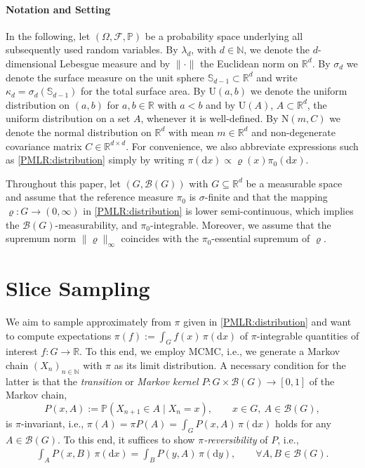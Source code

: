 \documentclass[sn-mathphys-num]{sn-jnl}%
\theoremstyle{thmstyleone}%
\theoremstyle{thmstyletwo}%
\theoremstyle{thmstylethree}%
\newcommand{\change}[1]{\bgroup\color{black}#1\egroup}    %
\begin{document}
\paragraph{Notation \change{and Setting}}
In the following, let $(\Omega, \mathcal{F}, \mathbb{P})$ be a probability space \change{underlying} all subsequently used random variables. By $\lambda_d$, with $d\in\mathbb N$, we denote the $d$-dimensional Lebesgue measure and by $\lVert \cdot \rVert$ the Euclidean norm on $\mathbb R^d$. 
By $\sigma_d$ we denote the surface measure on the unit sphere $\mathbb{S}_{d-1}\subset \mathbb R^d$ and write $\kappa_d=\sigma_d(\mathbb{S}_{d-1})$ for the total surface area. By $\mathrm{U}(a,b)$ we denote the uniform distribution on $(a,b)$ for $a, b\in\mathbb{R}$ with $a<b$ and by $\mathrm{U}(A)$\change{, $A\subset \mathbb R^d$,} the uniform distribution on a set $A$, whenever it is well-defined.
By $\mathrm N(m,C)$ we denote the normal distribution on $\mathbb{R}^d$ with mean $m \in \mathbb{R}^d$ and non-degenerate covariance matrix $C \in \mathbb{R}^{d\times d}$.
For convenience, we also 
abbreviate expressions 
such as \eqref{PMLR:distribution} simply by writing $\pi(\mathrm{d}x)\propto\varrho(x) \pi_0(\mathrm{d}x)$. 

\change{
Throughout this paper, let $(G,\mathcal{B}(G))$ with $G\subseteq \mathbb R^d$ be a measurable space and assume that the reference measure $\pi_0$ is $\sigma$-finite and that the mapping $\varrho\colon G\to(0,\infty)$ in \eqref{PMLR:distribution} is lower semi-continuous, which implies the $\mathcal{B}(G)$-measurability, and $\pi_0$-integrable.
Moreover, we assume that the supremum norm $\|\varrho\|_\infty$ coincides with the $\pi_0$-essential supremum of $\varrho$.    
}

\section{Slice Sampling}\label{sec:slice}
We aim to sample approximately from $\pi$ given in \eqref{PMLR:distribution} and want to compute expectations $\pi(f) := \int_G f(x)\, \pi(\mathrm{d} x)$ of $\pi$-integrable quantities of interest $f\colon G\to\mathbb R$. 
To this end, we employ MCMC, i.e., we generate a Markov chain $(X_n)_{n\in\mathbb{N}}$ with $\pi$ as its limit distribution.  
A necessary condition for the latter is that the \emph{transition} or \emph{Markov kernel} $P\colon G \times \mathcal{B}(G) \to [0,1]$ of the Markov chain,
\[
	P(x,A) 
    :=
    \mathbb{P}(X_{n+1}\in A \mid X_n=x),
    \qquad
    x \in G, \ A \in \mathcal{B}(G),
\]
is $\pi$-invariant, i.e., $\pi(A) = \pi P(A) = \int_G P(x, A)\, \pi(\mathrm d x)$ holds for any $A \in \mathcal{B}(G)$. To this end, it suffices to show \emph{$\pi$-reversibility} of $P$, i.e.,
\begin{align*}%
    \int_{A} P(x,B)  \, \pi(\mathrm{d}x)=\int_{B} P(y,A)  \, \pi(\mathrm{d}y), \qquad \forall A,B\in\mathcal{B}(G).
\end{align*}
\end{document}
